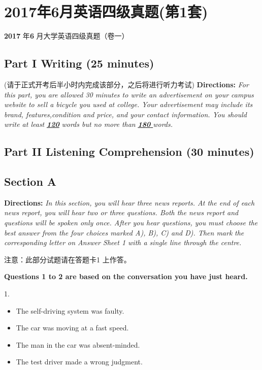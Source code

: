 \documentclass[UTF8,11pt]{ctexart}
\begin{document}
\section*{2017年6月英语四级真题(第1套)}
\textbf{2017} 年\textbf{6} 月大学英语四级真题（卷一）


\subsection*{\textbf{Part I} \textbf{Writing} \textbf{(25 minutes)}}


(请于正式开考后半小时内完成该部分，之后将进行听力考试) \textbf{Directions:}\textit{ For this part, you are allowed 30 minutes to write an advertisement on your campus website} \textit{to sell a bicycle you used at college. Your advertisement may include its brand, features,condition and} \textit{price, and your contact information. You should write at least}\textbf{\textit{ }}\textbf{\textit{\uline{120}}}\textit{ words but no more than}\textbf{\textit{ }}\textbf{\textit{\uline{180}}}\textit{\uline{ }}\textit{words.}


\subsection*{\textbf{Part II} \textbf{Listening Comprehension} \textbf{(30 minutes)}}


\subsection*{\textbf{Section A}}


\textbf{Directions:}\textit{ In this section, you will hear three news reports. At the end of each news report, you will} \textit{hear two or three questions. Both the news report and questions will be spoken only once. After you hear} \textit{questions, you must choose the best answer from the four choices marked A), B), C) and D). Then mark} \textit{the corresponding letter on Answer Sheet 1 with a single line through the centre.}


注意：此部分试题请在答题卡1 上作答。


\textbf{Questions 1 to 2 are based on the conversation you have just heard.}


1.


\begin{itemize}[leftmargin=2em,itemsep=.2em,topsep=.4em]\item[A.] The self-driving system was faulty.
\item[B.] The car was moving at a fast speed.
\item[C.] The man in the car was absent-minded.
\item[D.] The test driver made a wrong judgment.
\end{itemize}
\end{document}
